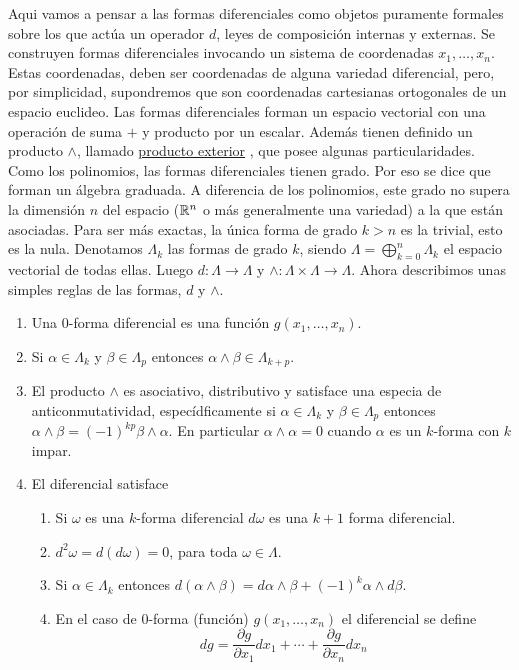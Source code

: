 \begin{subappendices}
Aqui vamos a pensar a las formas diferenciales como objetos puramente formales sobre los que actúa un operador $d$, leyes de composición internas y externas. Se construyen formas diferenciales invocando un sistema de coordenadas $x_1,\ldots,x_n$. Estas coordenadas, deben ser coordenadas de alguna variedad diferencial, pero, por simplicidad, supondremos que son coordenadas cartesianas ortogonales de un espacio euclideo. Las formas diferenciales forman un espacio vectorial con una operación de suma $+$ y producto por un escalar. Además tienen definido un producto $\wedge$, llamado \href{https://es.wikipedia.org/wiki/Producto_exterior}{producto exterior} , que posee  algunas particularidades.  Como los polinomios, las formas diferenciales tienen grado. Por eso se dice que forman un álgebra graduada. A diferencia de los polinomios, este grado no supera la dimensión $n$ del espacio ($\mathbb{R}^n$ o más generalmente una variedad) a la que están asociadas. Para ser más exactas, la única forma 
de 
grado $k>n$ es la trivial, esto es la nula. Denotamos $\Lambda_k$ las formas de grado $k$, siendo $\Lambda =\bigoplus_{k=0}^{n}\Lambda_k$ el espacio vectorial de todas ellas. Luego $d:\Lambda\to\Lambda$ y $\wedge:\Lambda\times\Lambda\to \Lambda$. Ahora describimos unas simples reglas de las formas,  $d$ y $\wedge$.



\begin{enumerate}
   \item Una 0-forma diferencial es una función $g(x_1,\ldots,x_n)$.

  \item Si $\alpha\in\Lambda_k$ y $\beta\in\Lambda_p$ entonces $\alpha \wedge \beta\in \Lambda_{k+p}$.
  \item El producto $\wedge$ es asociativo, distributivo y satisface una especia de anticonmutatividad, especídficamente si $\alpha\in\Lambda_k$ y $\beta\in\Lambda_p$ entonces $\alpha\wedge \beta=(-1)^{kp}\beta\wedge\alpha$. En particular $\alpha\wedge\alpha=0$ cuando $\alpha$ es un $k$-forma con $k$ impar.
  \item El diferencial satisface
  \begin{enumerate}
    \item Si $\omega$ es una $k$-forma diferencial $d\omega$ es una $k+1$ forma diferencial.
    \item  $d^2\omega=d(d\omega)=0$, para toda $\omega\in\Lambda$.
    \item Si $\alpha\in\Lambda_k$ entonces  $d(\alpha\wedge\beta)=d\alpha\wedge\beta+(-1)^k\alpha\wedge d\beta$.
    \item En el caso de $0$-forma (función) $g(x_1,\ldots,x_n)$ el diferencial se define
    \[dg=\frac{\partial g}{\partial x_1}dx_1+\cdots+\frac{\partial g}{\partial x_n}dx_n\]


\end{enumerate}
\end{enumerate}
\end{subappendices}
